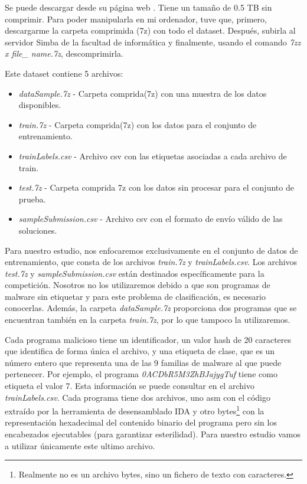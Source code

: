 Se puede descargar desde su página web \citep{kagglebig2015}. Tiene un tamaño de 0.5 TB sin comprimir. Para poder manipularla en mi ordenador, tuve que, primero, descargarme la carpeta comprimida (7z) con todo el dataset. Después, subirla al servidor Simba de la facultad de informática y finalmente, usando el comando \textit{7zz x file\_ name.7z}, descomprimirla. 

\newpage

Este dataset contiene 5 archivos:
\begin{itemize}
\item \textit{dataSample.7z} - Carpeta comprida(7z) con una muestra de los datos disponibles.
\item \textit{train.7z} - Carpeta comprida(7z) con los datos para el conjunto de entrenamiento.
\item \textit{trainLabels.csv} - Archivo csv con las etiquetas asociadas a cada archivo de train.
\item \textit{test.7z} - Carpeta comprida 7z con los datos sin procesar para el conjunto de prueba.
\item \textit{sampleSubmission.csv} - Archivo csv con el formato de envío válido de las soluciones.
\end{itemize}



Para nuestro estudio, nos enfocaremos exclusivamente en el conjunto de datos de entrenamiento, que consta de los archivos \textit{train.7z} y \textit{trainLabels.csv}. Los archivos \textit{test.7z} y \textit{sampleSubmission.csv} están destinados específicamente para la competición. Nosotros no los utilizaremos debido a que son programas de malware sin etiquetar y para este problema de clasificación, es necesario conocerlas.  Además, la carpeta \textit{dataSample.7z} proporciona dos programas que se encuentran también en la carpeta \textit{train.7z}, por lo que tampoco la utilizaremos. 


Cada programa malicioso tiene un identificador, un valor hash de 20 caracteres que identifica de forma única el archivo, y una etiqueta de clase, que es un número entero que representa una de las 9 familias de malware al que puede pertenecer. Por ejemplo, el programa \textit{0ACDbR5M3ZhBJajygTuf} tiene como etiqueta el valor 7. Esta información se puede consultar en el archivo \textit{trainLabels.csv}. Cada programa tiene dos archivos, uno asm con el código extraído por la herramienta de desensamblado IDA y otro bytes\footnote{Realmente no es un archivo bytes, sino un fichero de texto con caracteres.} con la representación hexadecimal del contenido binario del programa pero sin los encabezados ejecutables (para garantizar esterilidad). Para nuestro estudio vamos a utilizar únicamente este ultimo archivo. 

